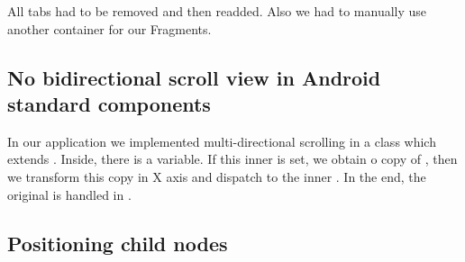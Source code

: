 All tabs had to be removed and then readded. Also we had to manually use another container for our Fragments.

\subsection{No bidirectional scroll view in Android standard components}
\label{subsec:problem-scrollview}
In our application we implemented multi-directional scrolling in a class  which extends . Inside, there is a  variable. If this inner  is set, we obtain o copy of , then we transform this copy in X axis and dispatch to the inner . In the end, the original  is handled in .

\subsection{Positioning child nodes}
\label{subsec:problem-positioning}
